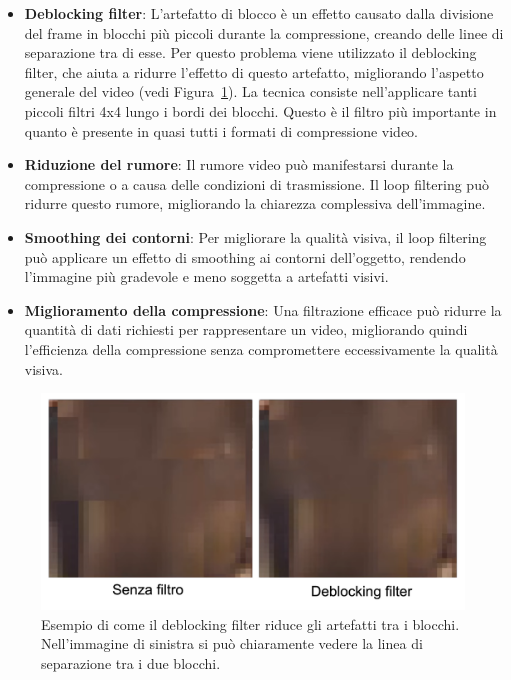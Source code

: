 \documentclass[a4paper,12pt, oneside]{article}
\begin{document}
\begin{itemize}
    \item \textbf{Deblocking filter}: L'artefatto di blocco è un effetto causato dalla divisione del frame
    in blocchi più piccoli durante la compressione, creando delle linee di separazione tra di esse.
    Per questo problema viene utilizzato il deblocking filter, che aiuta a ridurre l'effetto di questo
    artefatto, migliorando l'aspetto generale del video (vedi Figura~\ref{fig:deblocking_filter}). La
    tecnica consiste nell'applicare tanti piccoli filtri 4x4 lungo i bordi dei blocchi.
    Questo è il filtro più importante in quanto è presente in quasi tutti i formati di compressione video.
    \item \textbf{Riduzione del rumore}: Il rumore video può manifestarsi durante la compressione
    o a causa delle condizioni di trasmissione. Il loop filtering può ridurre questo rumore,
    migliorando la chiarezza complessiva dell'immagine.
    \item \textbf{Smoothing dei contorni}: Per migliorare la qualità visiva, il loop filtering può
    applicare un effetto di smoothing ai contorni dell'oggetto, rendendo l'immagine più gradevole e
    meno soggetta a artefatti visivi.
    \item \textbf{Miglioramento della compressione}: Una filtrazione efficace può ridurre la quantità
    di dati richiesti per rappresentare un video, migliorando quindi l'efficienza della compressione
    senza compromettere eccessivamente la qualità visiva.
\end{itemize}

\begin{figure}[h]
    \centering
    \includegraphics[width=1\textwidth]{images/deblocking-filter.png}
    \caption{Esempio di come il deblocking filter riduce gli artefatti tra i blocchi. Nell'immagine di
    sinistra si può chiaramente vedere la linea di separazione tra i due blocchi.}
    \label{fig:deblocking_filter}
\end{figure}
\end{document}
